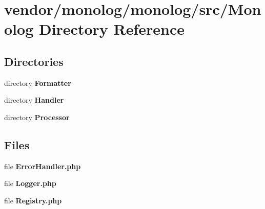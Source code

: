 \section{vendor/monolog/monolog/src/\+Monolog Directory Reference}
\label{dir_a5add31ab70f433b8fa8001326fe3210}
\subsection*{Directories}
\begin{DoxyCompactItemize}
\item 
directory {\bf Formatter}
\item 
directory {\bf Handler}
\item 
directory {\bf Processor}
\end{DoxyCompactItemize}
\subsection*{Files}
\begin{DoxyCompactItemize}
\item 
file {\bf Error\+Handler.\+php}
\item 
file {\bf Logger.\+php}
\item 
file {\bf Registry.\+php}
\end{DoxyCompactItemize}
